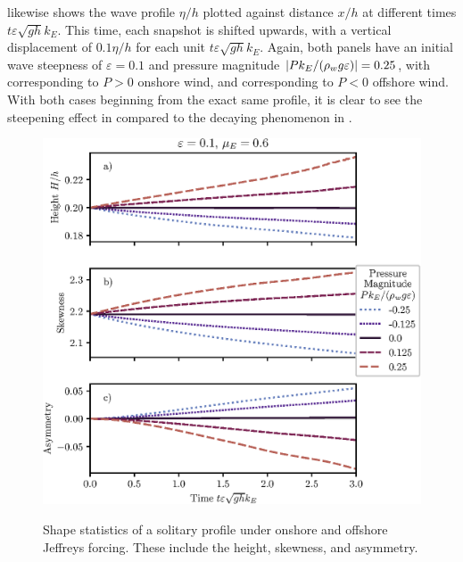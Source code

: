\documentclass{jfm}
\renewcommand*{\epsilon}{\varepsilon}
\begin{document}
 likewise shows the wave profile $\eta/h$
plotted against distance $x/h$ at different times $t \epsilon \sqrt{g h}
k_E$.
This time, each snapshot is shifted upwards, with a vertical
displacement of $0.1 \eta/h$ for each unit $t\epsilon \sqrt{g h} k_E$.
Again, both panels have an initial wave steepness of $\epsilon = 0.1$
and pressure magnitude $\abs{P k_E/(\rho_w g \epsilon)} = 0.25$, with
 corresponding to $P>0$ onshore wind,
and  corresponding to $P<0$ offshore
wind.
With both cases beginning from the exact same profile, it is clear to
see the steepening effect in  compared
to the decaying phenomenon in .

\begin{figure}
  \centering
  { %
    \label{fig:statistics_solitary:a}
    \label{fig:statistics_solitary:b}
    \label{fig:statistics_solitary:c}
  }
  \includegraphics{Skew-Asymm-No-Peak.eps}
  \caption{
    Shape statistics of a solitary profile under onshore and offshore
    Jeffreys forcing.
    These include the
    height,
    skewness, and
    asymmetry.
  }
  \label{fig:statistics_solitary}
\end{figure}
\end{document}
